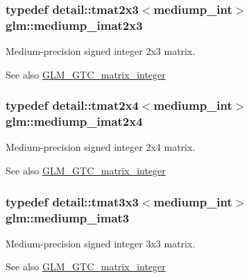 \subsubsection[{mediump\+\_\+imat2x3}]{\setlength{\rightskip}{0pt plus 5cm}typedef detail\+::tmat2x3$<$mediump\+\_\+int$>$ {\bf glm\+::mediump\+\_\+imat2x3}}\label{group__gtc__matrix__integer_gaafb4b3293de5875ece1181709eddaa13}
Medium-\/precision signed integer 2x3 matrix. \begin{DoxySeeAlso}{See also}
\hyperlink{group__gtc__matrix__integer}{G\+L\+M\+\_\+\+G\+T\+C\+\_\+matrix\+\_\+integer} 
\end{DoxySeeAlso}
\hypertarget{group__gtc__matrix__integer_gaebbf06f493d6299238987c9715dc9064}{}
\subsubsection[{mediump\+\_\+imat2x4}]{\setlength{\rightskip}{0pt plus 5cm}typedef detail\+::tmat2x4$<$mediump\+\_\+int$>$ {\bf glm\+::mediump\+\_\+imat2x4}}\label{group__gtc__matrix__integer_gaebbf06f493d6299238987c9715dc9064}
Medium-\/precision signed integer 2x4 matrix. \begin{DoxySeeAlso}{See also}
\hyperlink{group__gtc__matrix__integer}{G\+L\+M\+\_\+\+G\+T\+C\+\_\+matrix\+\_\+integer} 
\end{DoxySeeAlso}
\hypertarget{group__gtc__matrix__integer_gacb4d126bfdbc9d292e7cdfe6f3e481e6}{}
\subsubsection[{mediump\+\_\+imat3}]{\setlength{\rightskip}{0pt plus 5cm}typedef detail\+::tmat3x3$<$mediump\+\_\+int$>$ {\bf glm\+::mediump\+\_\+imat3}}\label{group__gtc__matrix__integer_gacb4d126bfdbc9d292e7cdfe6f3e481e6}
Medium-\/precision signed integer 3x3 matrix. \begin{DoxySeeAlso}{See also}
\hyperlink{group__gtc__matrix__integer}{G\+L\+M\+\_\+\+G\+T\+C\+\_\+matrix\+\_\+integer} 
\end{DoxySeeAlso}
\hypertarget{group__gtc__matrix__integer_ga91a2f7b0b7ab178581d8e10c56904f5d}{}
